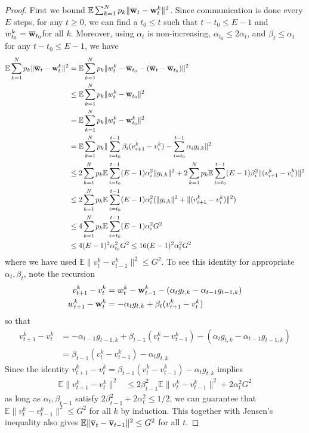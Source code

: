 \begin{proof}
First we bound $\mathbb{E}\sum_{k=1}^{N}p_{k}\|{\overline{\mathbf{w}}}_{t}-{\mathbf{w}}_{t}^{k}\|^{2}$.
Since communication is done every $E$ steps, for any $t\geq0$, we
can find a $t_{0}\leq t$ such that $t-t_{0}\leq E-1$ and $w_{t_{0}}^{k}={\overline{\mathbf{w}}}_{t_{0}}$for
all $k$. Moreover, using $\alpha_{t}$ is non-increasing, $\alpha_{t_{0}}\leq2\alpha{}_{t}$,
and $\beta_{t}\leq\alpha_{t}$ for any $t-t_{0}\leq E-1$, we have
\begin{align*}
\mathbb{E}\sum_{k=1}^{N}p_{k}\|{\overline{\mathbf{w}}}_{t}-{\mathbf{w}}_{t}^{k}\|^{2} & =\mathbb{E}\sum_{k=1}^{N}p_{k}\|w_{t}^{k}-{\overline{\mathbf{w}}}_{t_{0}}-({\overline{\mathbf{w}}}_{t}-{\overline{\mathbf{w}}}_{t_{0}})\|^{2}\\
& \leq\mathbb{E}\sum_{k=1}^{N}p_{k}\|w_{t}^{k}-{\overline{\mathbf{w}}}_{t_{0}}\|^{2}\\
& =\mathbb{E}\sum_{k=1}^{N}p_{k}\|w_{t}^{k}-{\mathbf{w}}_{t_{0}}^{k}\|^{2}\\
& =\mathbb{E}\sum_{k=1}^{N}p_{k}\|\sum_{i=t_{0}}^{t-1}\beta_{i}(v_{i+1}^{k}-v_{i}^{k})-\sum_{i=t_{0}}^{t-1}\alpha_{i}g_{i,k}\|^{2}\\
& \leq2\sum_{k=1}^{N}p_{k}\mathbb{E}\sum_{i=t_{0}}^{t-1}(E-1)\alpha_{i}^{2}\|g_{i,k}\|^{2}+2\sum_{k=1}^{N}p_{k}\mathbb{E}\sum_{i=t_{0}}^{t-1}(E-1)\beta_{i}^{2}\|(v_{i+1}^{k}-v_{i}^{k})\|^{2}\\
& \leq2\sum_{k=1}^{N}p_{k}\mathbb{E}\sum_{i=t_{0}}^{t-1}(E-1)\alpha_{i}^{2}(\|g_{i,k}\|^{2}+\|(v_{i+1}^{k}-v_{i}^{k})\|^{2})\\
& \leq4\sum_{k=1}^{N}p_{k}\mathbb{E}\sum_{i=t_{0}}^{t-1}(E-1)\alpha_{i}^{2}G^{2}\\
& \leq4(E-1)^{2}\alpha_{t_{0}}^{2}G^{2}\leq16(E-1)^{2}\alpha_{t}^{2}G^{2}
\end{align*}
where we have used $\mathbb{E}\|v_{t}^{k}-v_{t-1}^{k}\|^{2}\leq G^{2}$.
To see this identity for appropriate $\alpha_{t},\beta_{t}$, note
the recursion 
\begin{align*}
v_{t+1}^{k}-v_{t}^{k} & =w_{t}^{k}-{\mathbf{w}}_{t-1}^{k}-(\alpha_{t}g_{t,k}-\alpha_{t-1}g_{t-1,k})\\
w_{t+1}^{k}-{\mathbf{w}}_{t}^{k} & =-\alpha_{t}g_{t,k}+\beta_{t}(v_{t+1}^{k}-v_{t}^{k})
\end{align*}
so that 
\begin{align*}
v_{t+1}^{k}-v_{t}^{k} & =-\alpha_{t-1}g_{t-1,k}+\beta_{t-1}(v_{t}^{k}-v_{t-1}^{k})-(\alpha_{t}g_{t,k}-\alpha_{t-1}g_{t-1,k})\\
& =\beta_{t-1}(v_{t}^{k}-v_{t-1}^{k})-\alpha_{t}g_{t,k}
\end{align*}
Since the identity $v_{t+1}^{k}-v_{t}^{k}=\beta_{t-1}(v_{t}^{k}-v_{t-1}^{k})-\alpha_{t}g_{t,k}$
implies 
\begin{align*}
\mathbb{E}\|v_{t+1}^{k}-v_{t}^{k}\|^{2} & \leq2\beta_{t-1}^{2}\mathbb{E}\|v_{t}^{k}-v_{t-1}^{k}\|^{2}+2\alpha_{t}^{2}G^{2}
\end{align*}
as long as $\alpha_{t},\beta_{t-1}$ satisfy $2\beta_{t-1}^{2}+2\alpha_{t}^{2}\leq1/2$,
we can guarantee that $\mathbb{E}\|v_{t}^{k}-v_{t-1}^{k}\|^{2}\leq G^{2}$
for all $k$ by induction. This together with Jensen's inequality
also gives $\mathbb{E}\|{\overline{\mathbf{v}}}_{t}-{\overline{\mathbf{v}}}_{t-1}\|^{2}\leq G^{2}$
for all $t$. 


\end{proof}
